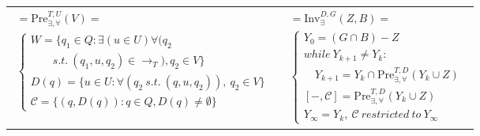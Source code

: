 \begin{table}
\footnotesize
\begin{tabular}{ll}
	\begin{minipage}{.5\textwidth}
		\begin{align}
	[W,\mathcal{C}]=\text{Pre}_{\exists,\forall}^{T,U}(V)=\quad \quad \quad \quad \quad \quad \quad\quad\quad\quad\quad\nonumber\\
	\begin{cases}
	W = \{q_1\in Q: \exists (u\in U) \forall (q_2\\\quad\quad s.t.\ (q_1, u, q_2) \in \rightarrow_T), q_2\in V\}\\
	D(q)=\{u\in U: \forall (q_2\ s.t.\ (q,u,q_2)),\ q_2\in V\}\\
	\mathcal{C}=\{(q,D(q)):q\in Q,D(q)\not=\emptyset\}
	\end{cases}\label{eqn:pre}
	\end{align}
	\end{minipage}& 
\begin{minipage}{.5\textwidth}
\begin{align} [Y_{\infty},\mathcal{C}]=\text{Inv}_{\exists}^{D,G}(Z,B)=\ \quad \quad \quad \nonumber\\
\begin{cases}Y_0 = (G\cap B) - Z\\
while\ Y_{k+1}\not=Y_k:\\
\quad Y_{k+1} = Y_k\cap \text{Pre}_{\exists,\forall}^{T,D}(Y_k\cup Z)\\
[-,\mathcal{C}] = \text{Pre}^{T,D}_{\exists,\forall}(Y_k\cup Z)\\
Y_{\infty} = Y_k,\ \mathcal{C}\ restricted\ to\ Y_{\infty}
\end{cases} \label{win-inv} \end{align}
\end{minipage} 
\end{tabular} 
\end{table}

\iffalse	
\begin{algorithm}
	\small
	\caption{$ \text{PGPre}_{\exists,\forall}^{T} (Z,B) $}
	\label{alg:algorithm-label}
	\begin{algorithmic}
		\REQUIRE $ T, U, Z, B $\\
		\STATE $ Z_{\infty} = Z,\ \mathcal{V} = \{\},\ \mathcal{K}=\{\}, k = 1 $
		\FOR{$ U\in 2^U $} \FOR{$ G\in G(U) $}
		\STATE $ [V_k,\mathcal{C}_k]=Inv_{\exists}^{U,G}(Z_{\infty},B) $, $ Z_{\infty} = Z_{\infty} \cup V_k $, $ \mathcal{V}(k)=V_k,\ \mathcal{K}(k)=\mathcal{C}_k $, $ {\color{black} k = k+1} $
		\ENDFOR
		\ENDFOR
		\RETURN $ \mathcal{C} = (\mathcal{V},\mathcal{K},x) $
	\end{algorithmic}
	\label{alg: win-pgpre}
	\end{algorithm}
\fi

